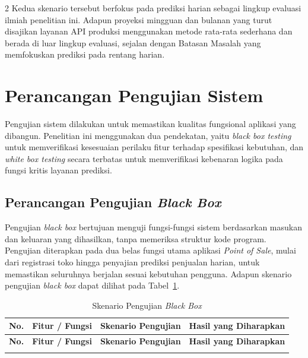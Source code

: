 \documentclass[12pt, a4paper, onecolumn, oneside]{report}
\begin{document}
\begin{spacing}{2}
Kedua skenario tersebut berfokus pada prediksi harian sebagai lingkup evaluasi ilmiah penelitian ini. Adapun proyeksi mingguan dan bulanan yang turut disajikan layanan API produksi menggunakan metode rata-rata sederhana dan berada di luar lingkup evaluasi, sejalan dengan Batasan Masalah yang memfokuskan prediksi pada rentang harian.
\section{Perancangan Pengujian Sistem}

Pengujian sistem dilakukan untuk memastikan kualitas fungsional aplikasi yang dibangun. Penelitian ini menggunakan dua pendekatan, yaitu \textit{black box testing} untuk memverifikasi kesesuaian perilaku fitur terhadap spesifikasi kebutuhan, dan \textit{white box testing} secara terbatas untuk memverifikasi kebenaran logika pada fungsi kritis layanan prediksi.

\subsection{Perancangan Pengujian \textit{Black Box}}

Pengujian \textit{black box} bertujuan menguji fungsi-fungsi sistem berdasarkan masukan dan keluaran yang dihasilkan, tanpa memeriksa struktur kode program. Pengujian diterapkan pada dua belas fungsi utama aplikasi \textit{Point of Sale}, mulai dari registrasi toko hingga penyajian prediksi penjualan harian, untuk memastikan seluruhnya berjalan sesuai kebutuhan pengguna. Adapun skenario pengujian \textit{black box} dapat dilihat pada Tabel~\ref{tab:blackbox}.

{
\begin{longtable}{|>{\centering\arraybackslash}p{0.6cm}|>{\raggedright\arraybackslash}p{3.0cm}|>{\raggedright\arraybackslash}p{4.7cm}|>{\raggedright\arraybackslash}p{4.7cm}|}
\caption{Skenario Pengujian \textit{Black Box}} \label{tab:blackbox} \\
\hline
\textbf{No.} & \textbf{Fitur / Fungsi} & \textbf{Skenario Pengujian} & \textbf{Hasil yang Diharapkan} \\
\hline
\endfirsthead

\hline
\textbf{No.} & \textbf{Fitur / Fungsi} & \textbf{Skenario Pengujian} & \textbf{Hasil yang Diharapkan} \\
\hline
\endhead

\hline
\endfoot
\hline
\endlastfoot


\end{longtable}}
\end{spacing}
\end{document}
